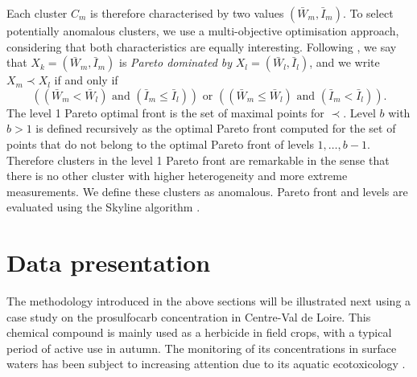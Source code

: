 Each cluster $C_m$ is therefore characterised by two values $(\bar{W}_m, \bar{I}_m)$. To select potentially anomalous clusters, we use a multi-objective optimisation approach, considering that both characteristics are equally interesting. Following \cite{KIELING2002311}, we say that  $X_k = (\bar{W}_m, \bar{I}_m)$ is \emph{Pareto dominated by} $X_l = (\bar{W}_l,\bar{I}_l)$, and we write $X_m \prec X_l$ if and only if
\begin{equation*}
    \left((\bar{W}_m<\bar{W}_l)\text{ and }(\bar{I}_m\leq \bar{I}_l)\right)
    \text{ or }\left((\bar{W}_m \leq \bar{W}_l)\text{ and }(\bar{I}_m < \bar{I}_l)\right).
\end{equation*}
The level 1 Pareto optimal front is the set of maximal points for $\prec$. Level $b$ with $b>1$ is defined recursively as the optimal Pareto front computed for the set of points that do not belong to the optimal Pareto front of levels $1,\ldots,b-1$. Therefore clusters in the level 1 Pareto front are remarkable in the sense that there is no other cluster with higher heterogeneity and more extreme measurements. We define these clusters as anomalous. Pareto front and levels are evaluated using the Skyline algorithm \cite{914855,endres2015scalagon}.

\section{Data presentation}\label{section:data}

The methodology introduced in the above sections will be illustrated next using a case study on the prosulfocarb  concentration \cite{Prosulfocarb:NIH:url} in Centre-Val de Loire. This chemical compound is mainly used as a herbicide in field crops, with a typical period of active use in autumn. The monitoring of its concentrations in surface waters has been subject to increasing attention due to its aquatic ecotoxicology \cite{PPV,Prosulfocarb:PPDB}.



